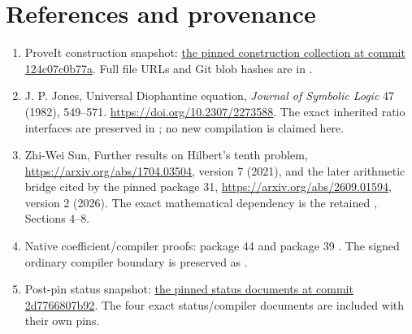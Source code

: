 \documentclass[11pt]{article}
\begin{document}
\section*{References and provenance}
\begin{enumerate}
\item ProveIt construction snapshot:
\href{https://github.com/VladimirReshetnikov/ProveIt/tree/124c07c0b77a9e20e84676514d8b1ff78536ea3f/Computability/DiophantineConsistency/con-zfc-diophantine-forms}{the pinned construction collection at commit 124c07c0b77a}.
Full file URLs and Git blob hashes are in .
\item J. P. Jones, Universal Diophantine equation, \emph{Journal of Symbolic
Logic} 47 (1982), 549--571. \url{https://doi.org/10.2307/2273588}.
The exact inherited ratio interfaces are preserved in
; no new compilation is claimed here.
\item Zhi-Wei Sun, Further results on Hilbert's tenth problem,
\url{https://arxiv.org/abs/1704.03504}, version 7 (2021), and the later
arithmetic bridge cited by the pinned package 31,
\url{https://arxiv.org/abs/2609.01594}, version 2 (2026).
The exact mathematical dependency is the retained
, Sections 4--8.
\item Native coefficient/compiler proofs: package 44
 and package 39
. The signed ordinary compiler
boundary is preserved as .
\item Post-pin status snapshot:
\href{https://github.com/VladimirReshetnikov/ProveIt/tree/2d7766807b92f6d505649885d472e20cc0236b4f/Computability/DiophantineConsistency}{the pinned status documents at commit 2d7766807b92}.
The four exact status/compiler documents are included with their own pins.
\end{enumerate}
\end{document}

